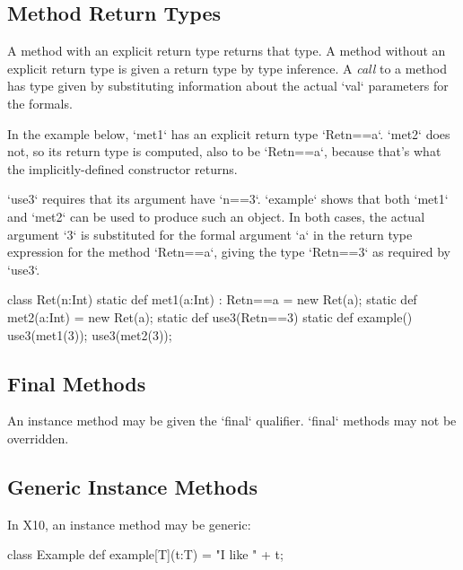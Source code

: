 \subsection{Method Return Types}

A method with an explicit return type returns that type.
A method without an
explicit return type is given a return type by type inference.
A {\em call} to a method has type given by substituting information about the
actual \xcd`val` parameters for the formals.

\begin{ex}

In the example below, \xcd`met1` has an explicit return type \xcd`Ret{n==a}`.
\xcd`met2` does not, so its return type is computed, also to be
\xcd`Ret{n==a}`, because that's what the implicitly-defined constructor 
returns.

\xcd`use3` requires that its argument have \xcd`n==3`.  
\xcd`example` shows that both \xcd`met1` and \xcd`met2` can be used to produce
such an object.  In both cases, the actual argument \xcd`3` is substituted for
the formal argument \xcd`a` in the return type expression for the method
\xcd`Ret{n==a}`, giving the type \xcd`Ret{n==3}` as required by \xcd`use3`.

\begin{xten}
class Ret(n:Int) {
  static def met1(a:Int) : Ret{n==a} = new Ret(a);
  static def met2(a:Int)             = new Ret(a);
  static def use3(Ret{n==3}) {}
  static def example() {
     use3(met1(3));
     use3(met2(3));
  }  
}
\end{xten}
%


\end{ex}


\subsection{Final Methods}
An instance method may be given the \xcd`final` qualifier.  \xcd`final`
methods may not be overridden.

\subsection{Generic Instance Methods}

\limitationx{}
In X10, an instance method may be generic: 
\begin{xten}
class Example {
  def example[T](t:T) = "I like " + t;
}
\end{xten}
%

